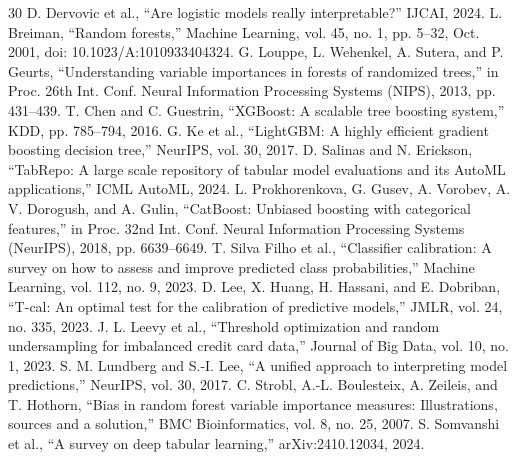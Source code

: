 \documentclass[conference]{IEEEtran}
\begin{document}
\begin{thebibliography}{30}
 D. Dervovic et al., ``Are logistic models really interpretable?'' IJCAI, 2024.
 L. Breiman, ``Random forests,'' Machine Learning, vol. 45, no. 1, pp. 5--32, Oct. 2001, doi: 10.1023/A:1010933404324.
 G. Louppe, L. Wehenkel, A. Sutera, and P. Geurts, ``Understanding variable importances in forests of randomized trees,'' in Proc. 26th Int. Conf. Neural Information Processing Systems (NIPS), 2013, pp. 431--439.
 T. Chen and C. Guestrin, ``XGBoost: A scalable tree boosting system,'' KDD, pp. 785--794, 2016.
 G. Ke et al., ``LightGBM: A highly efficient gradient boosting decision tree,'' NeurIPS, vol. 30, 2017.
 D. Salinas and N. Erickson, ``TabRepo: A large scale repository of tabular model evaluations and its AutoML applications,'' ICML AutoML, 2024.
 L. Prokhorenkova, G. Gusev, A. Vorobev, A. V. Dorogush, and A. Gulin, ``CatBoost: Unbiased boosting with categorical features,'' in Proc. 32nd Int. Conf. Neural Information Processing Systems (NeurIPS), 2018, pp. 6639--6649.
 T. Silva Filho et al., ``Classifier calibration: A survey on how to assess and improve predicted class probabilities,'' Machine Learning, vol. 112, no. 9, 2023.
 D. Lee, X. Huang, H. Hassani, and E. Dobriban, ``T-cal: An optimal test for the calibration of predictive models,'' JMLR, vol. 24, no. 335, 2023.
 J. L. Leevy et al., ``Threshold optimization and random undersampling for imbalanced credit card data,'' Journal of Big Data, vol. 10, no. 1, 2023.
 S. M. Lundberg and S.-I. Lee, ``A unified approach to interpreting model predictions,'' NeurIPS, vol. 30, 2017.
 C. Strobl, A.-L. Boulesteix, A. Zeileis, and T. Hothorn, ``Bias in random forest variable importance measures: Illustrations, sources and a solution,'' BMC Bioinformatics, vol. 8, no. 25, 2007.
 S. Somvanshi et al., ``A survey on deep tabular learning,'' arXiv:2410.12034, 2024.
\end{thebibliography}
\end{document}
